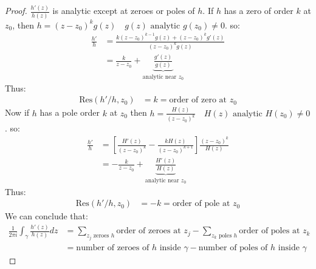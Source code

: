 \begin{proof}
    $\frac{h'(z)}{h(z)}$ is analytic except at zeroes or poles of $h$.
    If $h$ has a zero of order $k$ at $z_0$, then $h = (z - z_0)^kg(z) \quad g(z) \text{ analytic } g(z_0) \neq 0$. so:
    \begin{align*}
        \frac{h'}{h} & = \frac{k(z - z_0)^{k-1}g(z) + (z - z_0)^kg'(z)}{(z - z_0)^kg(z)}                 \\
                     & = \frac{k}{z - z_0} + \underbrace{\frac{g'(z)}{g(z)}}_{\text{analytic near } z_0}
    \end{align*}
    Thus:
    \begin{align*}
        \text{Res}(h'/h,z_0) & = k = \text{order of zero at } z_0
    \end{align*}
    Now if $h$ has a pole order $k$ at $z_0$ then $h = \frac{H(z)}{(z - z_0)^k} \quad H(z) \text{ analytic } H(z_0) \neq 0$. so:
    \begin{align*}
        \frac{h'}{h} & = \left[\frac{H'(z)}{(z - z_0)^k} - \frac{kH(z)}{(z - z_0)^{k+1}}\right]\frac{(z - z_0)^{k}}{H(z)} \\
                     & = -\frac{k}{z - z_0} + \underbrace{\frac{H'(z)}{H(z)}}_{\text{analytic near } z_0}
    \end{align*}
    Thus:
    \begin{align*}
        \text{Res}(h'/h,z_0) & = -k = \text{order of pole at } z_0
    \end{align*}
    We can conclude that:
    \begin{align*}
        \frac{1}{2\pi i}\int_{\gamma} \frac{h'(z)}{h(z)}dz & = \sum_{z_j \text{ zeroes } h} \text{order of zeroes at }z_j - \sum_{z_k \text{ poles } h} \text{order of poles at }z_k \\
                                                           & = \text{number of zeroes of } h \text{ inside } \gamma - \text{number of poles of } h \text{ inside } \gamma
    \end{align*}
\end{proof}

